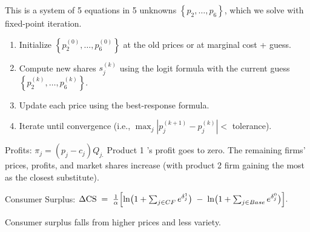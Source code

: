 This is a system of 5 equations in 5 unknowns $\left\{p_2, \ldots, p_6\right\}$, which we solve with fixed-point iteration.

\begin{enumerate}
    \item Initialize $\left\{p_2^{(0)}, \ldots, p_6^{(0)}\right\}$ at the old prices or at marginal cost + guess.
    \item Compute new shares $s_j^{(k)}$ using the logit formula with the current guess $\left\{p_2^{(k)}, \ldots, p_6^{(k)}\right\}$.
    \item Update each price using the best-response formula.
    \item  Iterate until convergence (i.e., $\max _j\left|p_j^{(k+1)}-p_j^{(k)}\right|<$ tolerance).
\end{enumerate}






Profits: $\pi_j=\left(p_j-c_j\right) Q_{j .}$ Product 1 's profit goes to zero. The remaining firms' prices, profits, and market shares increase (with product 2 firm gaining the most as the closest substitute).

Consumer Surplus: $\Delta \text{CS}
\;=\;
\frac{1}{\alpha}\Bigl[\ln\bigl(1 + \sum_{j\in CF} e^{\delta_j^1}\bigr)
\;-\;
\ln\bigl(1 + \sum_{j\in Base} e^{\delta_j^0}\bigr)\Bigr].
$

Consumer surplus falls from higher prices and less variety. 
